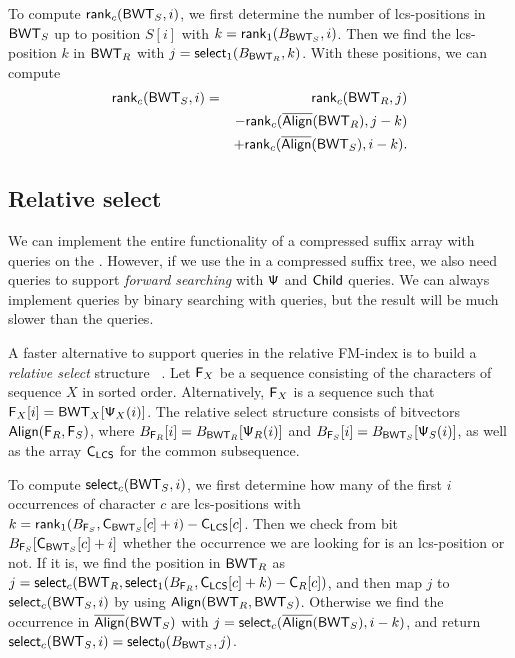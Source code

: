 To compute $\mathsf{rank}_{c}(\mathsf{BWT}_{S}, i)$, we first determine the number of
lcs-positions in $\mathsf{BWT}_{S}$ up to position $S[i]$ with $k =
\mathsf{rank}_{1}(B_{\mathsf{BWT}_{S}}, i)$. Then we find the lcs-position $k$ in $\mathsf{BWT}_{R}$
with $j = \mathsf{select}_{1}(B_{\mathsf{BWT}_{R}}, k)$. With these positions, we can compute
\begin{eqnarray*}
\mathsf{rank}_{c}(\mathsf{BWT}_{S}, i) &=& \mathsf{rank}_{c}(\mathsf{BWT}_{R}, j) \\
   && - \mathsf{rank}_{c}(\overline{ \mathsf{Align} }(\mathsf{BWT}_{R}),j-k) \\
   && + \mathsf{rank}_{c}(\overline{ \mathsf{Align} }(\mathsf{BWT}_{S}), i-k).
\end{eqnarray*}

\subsection{Relative select}

We can implement the entire functionality of a compressed suffix array with
\rank{} queries on the \BWT. However, if we use the \CSA{} in a compressed
suffix tree, we also need \select{} queries to support \emph{forward
searching} with $\mathsf{\Psi}$ and $\mathsf{Child}$ queries. We can always implement
\select{} queries by binary searching with \rank{} queries, but the result
will be much slower than the \rank{} queries.

A faster alternative to support \select{} queries in the relative FM-index
is to build a \emph{relative select} structure \rselect{}~\cite{Boucher2015}.
Let $\mathsf{F}_{X}$ be a sequence consisting of the characters of sequence $X$ in
sorted order. Alternatively, $\mathsf{F}_{X}$ is a sequence such that $\mathsf{F}_{X}[i] =
\mathsf{BWT}_{X}[\mathsf{\Psi}_X(i)]$. The relative select structure consists of bitvectors
$\mathsf{Align}(\mathsf{F}_{R}, \mathsf{F}_{S})$, where $B_{\mathsf{F}_{R}}[i] = B_{\mathsf{BWT}_{R}}[\mathsf{\Psi}_R(i)]$ 
and $B_{\mathsf{F}_{S}}[i] = B_{\mathsf{BWT}_{S}}[\mathsf{\Psi}_S(i)]$, as well as the \C{} array
$\mathsf{C}_{\mathsf{LCS}}$ for the common subsequence.

To compute $\mathsf{select}_{c}(\mathsf{BWT}_{S}, i)$, we first determine how many of
the first $i$ occurrences of character $c$ are lcs-positions with $k =
\mathsf{rank}_{1}(B_{\mathsf{F}_{S}}, \mathsf{C}_{\mathsf{BWT}_{S}}[c] + i) - \mathsf{C}_{\mathsf{LCS}}[c]$. Then we check
from bit $B_{\mathsf{F}_{S}}[\mathsf{C}_{\mathsf{BWT}_{S}}[c] + i]$ whether the occurrence we are
looking for is an lcs-position or not. If it is,
we find the position in $\mathsf{BWT}_{R}$ as $j = \mathsf{select}_{c}(\mathsf{BWT}_{R},
\mathsf{select}_{1}(B_{\mathsf{F}_{R}}, \mathsf{C}_{\mathsf{LCS}}[c] + k)- \mathsf{C}_{R}[c])$, and then map $j$ to
$\mathsf{select}_{c}(\mathsf{BWT}_{S}, i)$ by using $\mathsf{Align}(\mathsf{BWT}_{R}, \mathsf{BWT}_{S})$. Otherwise we
find the occurrence in $\overline{ \mathsf{Align} }(\mathsf{BWT}_{S})$ with $j = \mathsf{select}_{c}(\overline{ \mathsf{Align} }(\mathsf{BWT}_{S}),
i-k)$, and return $\mathsf{select}_{c}(\mathsf{BWT}_{S}, i) = \mathsf{select}_{0}(B_{\mathsf{BWT}_{S}}, j)$.

